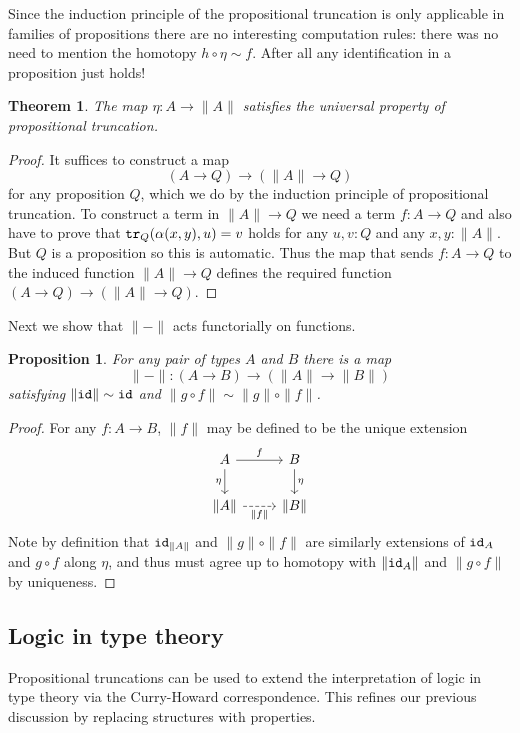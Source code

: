 \documentclass{amsart}
\theoremstyle{theorem}
\newtheorem*{thm}{Theorem}
\newtheorem*{prop}{Proposition}
\theoremstyle{definition}
\theoremstyle{remark}
\newcommand{\0}{\mathbbe{0}}
\newcommand{\1}{\mathbbe{1}}
\newcommand{\2}{\mathbbe{2}}
\newcommand{\3}{\mathbbe{3}}
\newcommand{\4}{\mathbbe{4}}
\newcommand{\term}[1]{{\textup{\texttt{#1}}}}
\newcommand{\id}{\term{id}}
\newcommand{\tr}{\term{tr}}
\newcommand{\mere}[1]{\|{#1}\|}
\begin{document}
Since the induction principle of the propositional truncation is only applicable in families of propositions there are no interesting computation rules: there was no need to mention the homotopy $h \circ \eta \sim f$. After all any identification in a proposition just holds!


\begin{thm} The map $\eta \colon A \to \mere{A}$ satisfies the universal property of propositional truncation.
\end{thm}
\begin{proof}
It suffices to construct a map
\[ (A \to Q) \to (\mere{A} \to Q)\]
for any proposition $Q$, which we do by the induction principle of propositional truncation. To construct a term in $\mere{A} \to Q$ we need a term $f : A \to Q$ and also have to prove that $\tr_{Q}(\alpha(x,y), u)=v$ holds for any $u, v :Q$ and any $x,y : \mere{A}$. But $Q$ is a proposition so this is automatic. Thus the map that sends $f : A \to Q$ to the induced function $\mere{A} \to Q$ defines the required function $(A \to Q) \to (\mere{A} \to Q)$.
\end{proof}

Next we show that $\mere{-}$ acts functorially on functions.

\begin{prop} For any pair of types $A$ and $B$ there is a map
\[ \mere{-} \colon (A \to B) \to (\mere{A} \to \mere{B})\]
satisfying $\mere{\id} \sim \id$ and $\mere{g \circ f} \sim \mere{g} \circ \mere{f}$.
\end{prop}
\begin{proof}
For any $f : A \to B$, $\mere{f}$ may be defined to be the unique extension
\[
\begin{tikzcd} A \arrow[r, "f"] \arrow[d, "\eta"'] & B \arrow[d, "\eta"] \\ \mere{A} \arrow[r, dashed, "\mere{f}"'] & \mere{B}
\end{tikzcd}
\]
Note by definition that $\id_{\mere{A}}$ and $\mere{g}\circ\mere{f}$ are similarly extensions of $\id_A$ and $g \circ f$ along $\eta$, and thus must agree up to homotopy with $\mere{\id_A}$ and $\mere{g \circ f}$ by uniqueness.
\end{proof}

\subsection*{Logic in type theory}

Propositional truncations can be used to extend the interpretation of logic in type theory via the Curry-Howard correspondence. This refines our previous discussion by replacing structures with properties.
\end{document}
